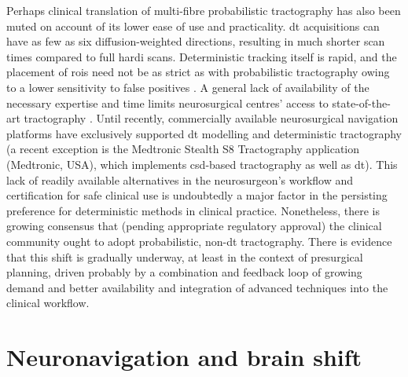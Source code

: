 Perhaps clinical translation of multi-fibre probabilistic tractography has also been muted on account of its lower ease of use and practicality.
\Gls{dt} acquisitions can have as few as six diffusion-weighted directions, resulting in much shorter scan times compared to full \gls{hardi} scans.
Deterministic tracking itself is rapid, and the placement of \glspl{roi} need not be as strict as with probabilistic tractography owing to a lower sensitivity to false positives \autocite{ODonnell2017}.
A general lack of availability of the necessary expertise and time limits neurosurgical centres' access to state-of-the-art tractography \autocite{Toescu2020}.
Until recently, commercially available neurosurgical navigation platforms have exclusively supported \gls{dt} modelling and deterministic tractography (a recent exception is the Medtronic Stealth\texttrademark{} S8 Tractography application (Medtronic, USA), which implements \gls{csd}-based tractography\autocite{Pozzilli2023} as well as \gls{dt}).
This lack of readily available alternatives in the neurosurgeon's workflow and certification for safe clinical use is undoubtedly a major factor in the persisting preference for deterministic methods in clinical practice.
Nonetheless, there is growing consensus that (pending appropriate regulatory approval) the clinical community ought to adopt probabilistic, non-\gls{dt} tractography\autocite{Yang2021, Beare2022, Petersen2017}.
There is evidence that this shift is gradually underway, at least in the context of presurgical planning\autocite{Toescu2020}, driven probably by a combination and feedback loop of growing demand and better availability and integration of advanced techniques into the clinical workflow.

\section{Neuronavigation and brain shift}


